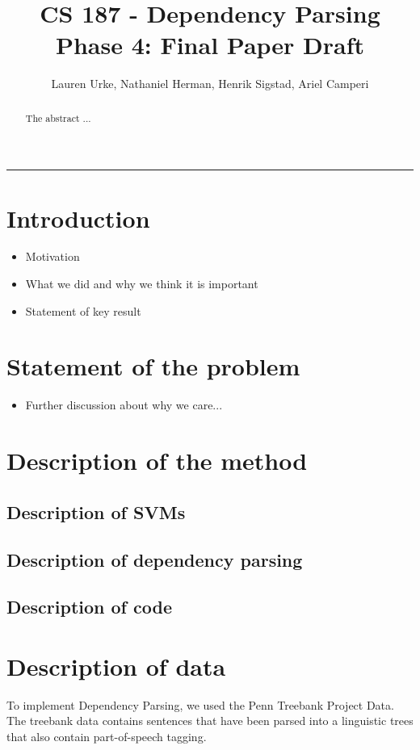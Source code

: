 \documentclass[12pt,fleqn]{article}
\title{CS 187 - Dependency Parsing\\Phase 4: Final Paper Draft}
\author{Lauren Urke, Nathaniel Herman, Henrik Sigstad, Ariel Camperi}
\date{}
\begin{document}
    \maketitle
    \hrule
\begin{abstract}
The abstract ...
\end{abstract}
\section{Introduction}
\begin{itemize}
\item Motivation
\item What we did and why we think it is important
\item Statement of key result
\end{itemize}

\section{Statement of the problem}
\begin{itemize}
\item Further discussion about why we care...
\end{itemize}

\section{Description of the method}

\subsection{Description of SVMs}
\subsection{Description of dependency parsing}
\subsection{Description of code}

\section{Description of data}
To implement Dependency Parsing, we used the Penn Treebank Project Data. The treebank data contains sentences that have been parsed into a linguistic trees that also contain part-of-speech tagging. \\
\end{document}
